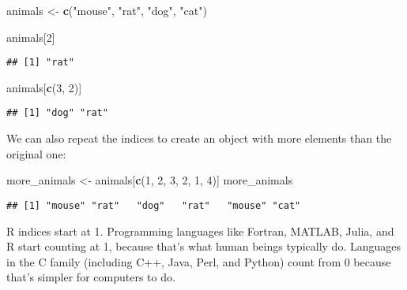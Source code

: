 \documentclass[]{book}
\newenvironment{Shaded}{\begin{snugshade}}{\end{snugshade}}
\newcommand{\KeywordTok}[1]{\textcolor[rgb]{0.13,0.29,0.53}{\textbf{#1}}}
\newcommand{\DecValTok}[1]{\textcolor[rgb]{0.00,0.00,0.81}{#1}}
\newcommand{\StringTok}[1]{\textcolor[rgb]{0.31,0.60,0.02}{#1}}
\newcommand{\NormalTok}[1]{#1}
\begin{document}
\begin{Shaded}
\begin{Highlighting}[]
\NormalTok{animals <-}\StringTok{ }\KeywordTok{c}\NormalTok{(}\StringTok{"mouse"}\NormalTok{, }\StringTok{"rat"}\NormalTok{, }\StringTok{"dog"}\NormalTok{, }\StringTok{"cat"}\NormalTok{)}
\end{Highlighting}
\end{Shaded}

\begin{Shaded}
\begin{Highlighting}[]
\NormalTok{animals[}\DecValTok{2}\NormalTok{]}
\end{Highlighting}
\end{Shaded}

\begin{verbatim}
## [1] "rat"
\end{verbatim}

\begin{Shaded}
\begin{Highlighting}[]
\NormalTok{animals[}\KeywordTok{c}\NormalTok{(}\DecValTok{3}\NormalTok{, }\DecValTok{2}\NormalTok{)]}
\end{Highlighting}
\end{Shaded}

\begin{verbatim}
## [1] "dog" "rat"
\end{verbatim}

We can also repeat the indices to create an object with more elements
than the original one:

\begin{Shaded}
\begin{Highlighting}[]
\NormalTok{more_animals <-}\StringTok{ }\NormalTok{animals[}\KeywordTok{c}\NormalTok{(}\DecValTok{1}\NormalTok{, }\DecValTok{2}\NormalTok{, }\DecValTok{3}\NormalTok{, }\DecValTok{2}\NormalTok{, }\DecValTok{1}\NormalTok{, }\DecValTok{4}\NormalTok{)]}
\NormalTok{more_animals}
\end{Highlighting}
\end{Shaded}

\begin{verbatim}
## [1] "mouse" "rat"   "dog"   "rat"   "mouse" "cat"
\end{verbatim}

R indices start at 1. Programming languages like Fortran, MATLAB, Julia,
and R start counting at 1, because that's what human beings typically
do. Languages in the C family (including C++, Java, Perl, and Python)
count from 0 because that's simpler for computers to do.
\end{document}
